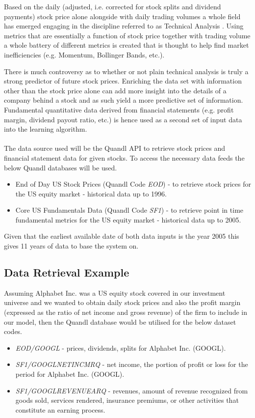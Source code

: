 \documentclass[dvips,12pt]{article}
\begin{document}
Based on the daily (adjusted, i.e. corrected for stock splits and dividend payments) stock price alone alongside with daily trading volumes a whole field has emerged engaging in the discipline referred to as Technical Analysis \cite{murphy1998}. Using metrics that are essentially a function of stock price together with trading volume a whole battery of different metrics is created that is thought to help find market inefficiencies (e.g. Momentum, Bollinger Bands, etc.). 

There is much controversy as to whether or not plain technical analysis is truly a strong predictor of future stock prices. Enriching the data set with information other than the stock price alone can add more insight into the details of a company behind a stock and as such yield a more predictive set of information. Fundamental quantitative data derived from financial statements (e.g. profit margin, dividend payout ratio, etc.) is hence used as a second set of input data into the learning algorithm.
\\\\
The data source used will be the Quandl API to retrieve stock prices and financial statement data for given stocks.
To access the necessary data feeds the below Quandl databases will be used.

\begin{itemize}
	\item End of Day US Stock Prices (Quandl Code \emph{EOD}) - to retrieve stock prices for the US equity market - historical data up to 1996.
	\item Core US Fundamentals Data (Quandl Code \emph{SF1}) - to retrieve point in time fundamental metrics for the US equity market - historical data up to 2005.
\end{itemize}

Given that the earliest available date of both data inputs is the year 2005 this gives 11 years of data to base the system on.

\subsection*{Data Retrieval Example}
Assuming Alphabet Inc. was a US equity stock covered in our investment universe and we wanted to obtain daily stock prices and also the profit margin (expressed as the ratio of net income and gross revenue) of the firm to include in our model, then the Quandl database would be utilised for the below dataset codes.

\begin{itemize}
	\item \emph{EOD/GOOGL} - prices, dividends, splits for Alphabet Inc. (GOOGL).
	\item \emph{SF1/GOOGL\textunderscore NETINC\textunderscore MRQ} - net income, the portion of profit or loss for the period for Alphabet Inc. (GOOGL).
	\item \emph{SF1/GOOGL\textunderscore REVENUE\textunderscore ARQ} -  revenues, amount of revenue recognized from goods sold, services rendered, insurance premiums, or other activities that constitute an earning process.
\end{itemize}
\end{document}
